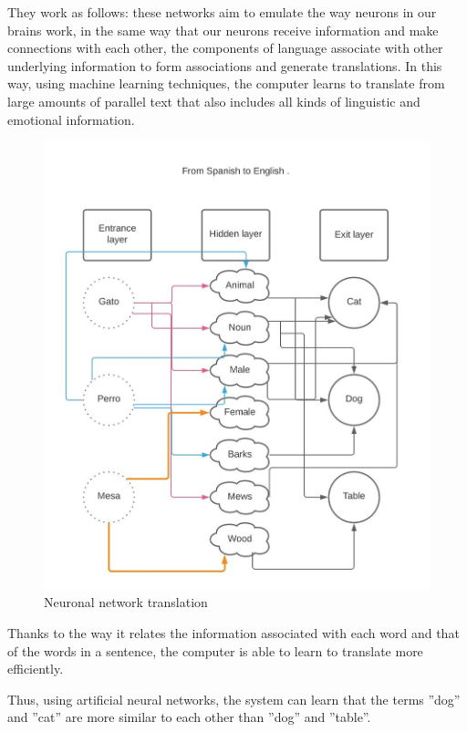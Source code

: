 \documentclass[a4paper]{article}
\theoremstyle{plain}
\theoremstyle{definition}
\begin{document}
     
    They work as follows: these networks aim to emulate the way neurons in our brains work, in the same way that our neurons receive information and make connections with each other, the components of language associate with other underlying information to form associations and generate translations. In this way, using machine learning techniques, the computer learns to translate from large amounts of parallel text that also includes all kinds of linguistic and emotional information.\newline
   \begin{figure}
        \includegraphics[width=0.95\linewidth]{neuronal.jpeg} 
        \caption{Neuronal network translation}
        \label{fig:wrapfig}
    \end{figure}

    Thanks to the way it relates the information associated with each word and that of the words in a sentence, the computer is able to learn to translate more efficiently.\newline
    
	Thus, using artificial neural networks, the system can learn that the terms ''dog'' and ''cat'' are more similar to each other than ''dog'' and ''table''.\newline
\end{document}
